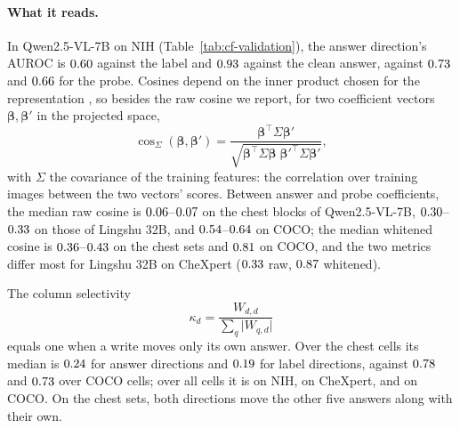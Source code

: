 \documentclass{article}
\begin{document}
\paragraph{What it reads.} In Qwen2.5-VL-7B on NIH (Table~\ref{tab:cf-validation}), the answer direction's AUROC is $0.60$ against the label and $0.93$ against the clean answer, against $0.73$ and $0.66$ for the probe. Cosines depend on the inner product chosen for the representation \citep{park2024linear}, so besides the raw cosine we report, for two coefficient vectors $\boldsymbol\beta,\boldsymbol\beta'$ in the projected space,
\begin{equation}
\cos_\Sigma(\boldsymbol\beta,\boldsymbol\beta')=\frac{\boldsymbol\beta^{\top}\Sigma\boldsymbol\beta'}{\sqrt{\boldsymbol\beta^{\top}\Sigma\boldsymbol\beta\;\boldsymbol\beta'^{\top}\Sigma\boldsymbol\beta'}},
\label{eq:whitened-cos}
\end{equation}
with $\Sigma$ the covariance of the training features: the correlation over training images between the two vectors' scores. Between answer and probe coefficients, the median raw cosine is $0.06$--$0.07$ on the chest blocks of Qwen2.5-VL-7B, $0.30$--$0.33$ on those of Lingshu 32B, and $0.54$--$0.64$ on COCO; the median whitened cosine is $0.36$--$0.43$ on the chest sets and $0.81$ on COCO, and the two metrics differ most for Lingshu 32B on CheXpert ($0.33$ raw, $0.87$ whitened).

The column selectivity
\begin{equation}
\kappa_d=\frac{W_{d,d}}{\sum_q\lvert W_{q,d}\rvert}
\label{eq:column-selectivity}
\end{equation}
equals one when a write moves only its own answer. Over the \cfAnsColSelChestN{} chest cells its median is $0.24$ for answer directions and $0.19$ for label directions, against $0.78$ and $0.73$ over \cfAnsColSelCocoN{} COCO cells; over all cells it is \cfValColSelNih{} on NIH, \cfValColSelChex{} on CheXpert, and \cfValColSelCoco{} on COCO. On the chest sets, both directions move the other five answers along with their own.
\end{document}
